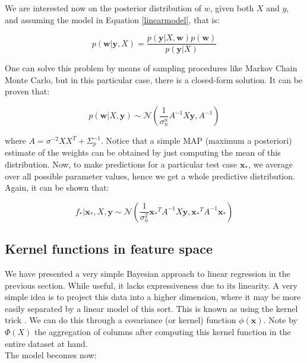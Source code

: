 \documentclass[10pt,a4paper,twoside]{book}
\begin{document}
We are interested now on the posterior distribution of $w$, given both $X$ and $y$, and assuming the model in Equation \ref{linearmodel}, that is:

\begin{equation}
p(\boldsymbol{w}|\boldsymbol{y}, X) = \dfrac{p(\boldsymbol{y}|X, \boldsymbol{w}) p(\boldsymbol{w})}{p(\boldsymbol{y}| X)}
\end{equation}

One can solve this problem by means of sampling procedures like Markov Chain Monte Carlo, but in this particular case, there is a closed-form solution. It can be proven that:

\begin{equation}
p(\boldsymbol{w}|X, \boldsymbol{y}) \sim \mathcal{N} \left(\dfrac{1}{\sigma_n^n}A^{-1}X\boldsymbol{y}, A^{-1}\right)
\end{equation}

where $A = \sigma^{-2}XX^T + \Sigma_p^{-1}$. Notice that a simple MAP (maximum a posteriori) estimate of the weights can be obtained by just computing the mean of this distribution. Now, to make predictions for a particular test case $\boldsymbol{x_{*}}$, we average over all possible parameter values, hence we get a whole predictive distribution. Again, it can be shown that:

\begin{equation}
f_{*}|\boldsymbol{x_{*}}, X, \boldsymbol{y} \sim \mathcal{N}\left(\dfrac{1}{\sigma_n^2}\boldsymbol{x_{*}}^T A^{-1}X\boldsymbol{y}, \boldsymbol{x_*}^T A^{-1} \boldsymbol{x}_{*}\right)
\end{equation} 

\subsection{Kernel functions in feature space}

We have presented a very simple Bayesian approach to linear regression in the previous section. While useful, it lacks expressiveness due to its linearity. A very simple idea is to project this data into a higher dimension, where it may be more easily separated by a linear model of this sort. This is known as using the kernel trick \cite{Hofmann2008}. We can do this through a covariance (or kernel) function $\phi(\boldsymbol{x})$. Note by $\Phi(X)$ the aggregation of columns after computing this kernel function in the entire dataset at hand.\\

The model becomes now:
\end{document}
